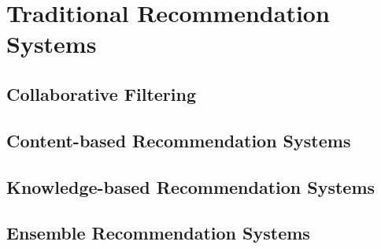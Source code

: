 %
%
%
\chapter{Traditional Recommendation Systems}
\label{intro} %

\abstract{}
\section{Collaborative Filtering}

\section{Content-based Recommendation Systems}

\section{Knowledge-based Recommendation Systems}

\section{Ensemble Recommendation Systems}


